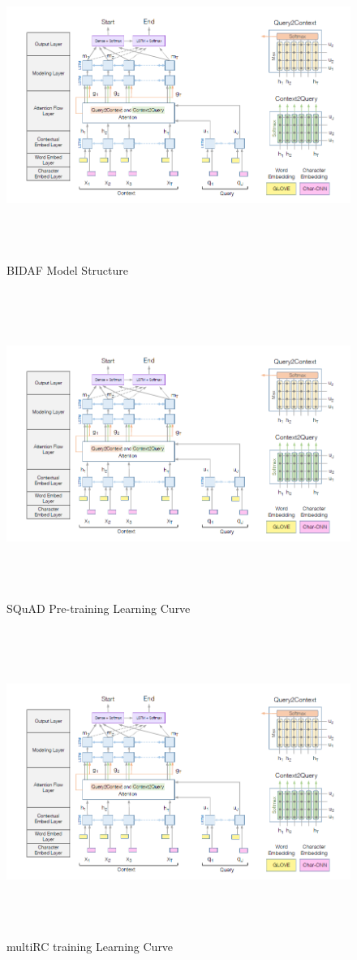 \documentclass[12pt, a4paper]{article}
\begin{document}
	\begin{figure}
		\includegraphics[width=\textwidth,height=10cm]{images/bidaf.png}
		\caption{BIDAF Model Structure}
	\end{figure}
	
	\begin{figure}
		\includegraphics[width=\textwidth,height=10cm]{images/bidaf.png}
		\caption{SQuAD Pre-training Learning Curve}
	\end{figure}
	
	\begin{figure}
		\includegraphics[width=\textwidth,height=10cm]{images/bidaf.png}
		\caption{multiRC training Learning Curve}
	\end{figure}

	\printbibliography
	
\end{document}
